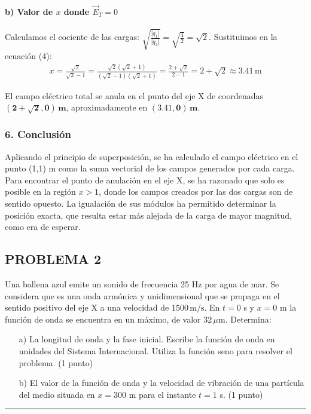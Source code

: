 \paragraph*{b) Valor de $x$ donde $\vec{E}_T=0$}
Calculamos el cociente de las cargas: $\sqrt{\frac{|q_1|}{|q_2|}} = \sqrt{\frac{4}{2}} = \sqrt{2}$.
Sustituimos en la ecuación (4):
\begin{gather}
    x = \frac{\sqrt{2}}{\sqrt{2}-1} = \frac{\sqrt{2}(\sqrt{2}+1)}{(\sqrt{2}-1)(\sqrt{2}+1)} = \frac{2+\sqrt{2}}{2-1} = 2+\sqrt{2} \approx 3.41 \, \text{m}
\end{gather}
\begin{cajaresultado}
    El campo eléctrico total se anula en el punto del eje X de coordenadas $\boldsymbol{(2+\sqrt{2}, 0) \, \textbf{m}}$, aproximadamente en $\boldsymbol{(3.41, 0) \, \textbf{m}}$.
\end{cajaresultado}

\subsubsection*{6. Conclusión}
\begin{cajaconclusion}
Aplicando el principio de superposición, se ha calculado el campo eléctrico en el punto (1,1) m como la suma vectorial de los campos generados por cada carga. Para encontrar el punto de anulación en el eje X, se ha razonado que solo es posible en la región $x>1$, donde los campos creados por las dos cargas son de sentido opuesto. La igualación de sus módulos ha permitido determinar la posición exacta, que resulta estar más alejada de la carga de mayor magnitud, como era de esperar.
\end{cajaconclusion}

\newpage
\subsection{PROBLEMA 2}
\label{subsec:P2_2024_jun_ord}

\begin{cajaenunciado}
Una ballena azul emite un sonido de frecuencia 25 Hz por agua de mar. Se considera que es una onda armónica y unidimensional que se propaga en el sentido positivo del eje X a una velocidad de $1500\,\text{m/s}$. En $t=0$ s y $x=0$ m la función de onda se encuentra en un máximo, de valor $32\,\mu\text{m}$. Determina:
\begin{enumerate}
    \item[a)] La longitud de onda y la fase inicial. Escribe la función de onda en unidades del Sistema Internacional. Utiliza la función seno para resolver el problema. (1 punto)
    \item[b)] El valor de la función de onda y la velocidad de vibración de una partícula del medio situada en $x=300$ m para el instante $t=1$ s. (1 punto)
\end{enumerate}
\end{cajaenunciado}
\hrule

